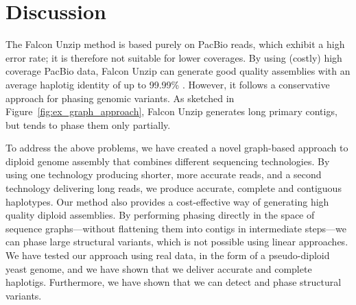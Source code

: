 


\section{Discussion}
The Falcon Unzip method \citep{chin2016phased} is based purely on PacBio reads, which exhibit a high error rate; it is therefore not suitable for lower coverages.
By using (costly) high coverage PacBio data, Falcon Unzip can generate good quality assemblies with an average haplotig identity of up to 99.99\% \citep{chin2016phased}.
However, it follows a conservative approach for phasing genomic variants.
As sketched in Figure~\ref{fig:ex_graph_approach}, Falcon Unzip generates long primary contigs, but tends to phase them only partially.

To address the above problems, we have created a novel graph-based approach to diploid genome assembly that combines different sequencing technologies.
By using one technology producing shorter, more accurate reads, and a second technology delivering long reads, we produce accurate, complete and contiguous haplotypes. 
Our method also provides a cost-effective way of generating high quality diploid assemblies.
By performing phasing directly in the space of sequence graphs---without flattening them into contigs in intermediate steps---we can phase large structural variants, which is not possible using linear approaches. 
We have tested our approach using real data, in the form of a pseudo-diploid yeast genome, and we have shown that we deliver accurate and complete haplotigs.
Furthermore, we have shown that we can detect and phase structural variants.

